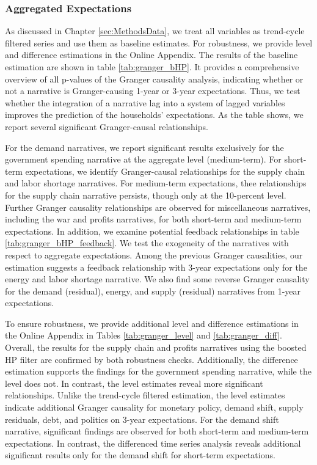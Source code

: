 \subsubsection{Aggregated Expectations}

As discussed in Chapter \ref{sec:MethodsData}, we treat all variables as trend-cycle filtered series and use them as baseline estimates. For robustness, we provide level and difference estimations in the Online Appendix. The results of the baseline estimation are shown in table \ref{tab:granger_bHP}. It provides a comprehensive overview of all p-values of the Granger causality analysis, indicating whether or not a narrative is Granger-causing 1-year or 3-year expectations. Thus, we test whether the integration of a narrative lag into a system of lagged variables improves the prediction of the households' expectations. As the table shows, we report several significant Granger-causal relationships.

For the demand narratives, we report significant results exclusively for the government spending narrative at the aggregate level (medium-term). For short-term expectations, we identify Granger-causal relationships for the supply chain and labor shortage narratives. For medium-term expectations, thee relationships for the supply chain narrative persists, though only at the 10-percent level. Further Granger causality relationships are observed for miscellaneous narratives, including the war and profits narratives, for both short-term and medium-term expectations. In addition, we examine potential feedback relationships in table \ref{tab:granger_bHP_feedback}. We test the exogeneity of the narratives with respect to aggregate expectations. Among the previous Granger causalities, our estimation suggests a feedback relationship with 3-year expectations only for the energy and labor shortage narrative. We also find some reverse Granger causality for the demand (residual), energy, and supply (residual) narratives from 1-year expectations.



To ensure robustness, we provide additional level and difference estimations in the Online Appendix in Tables \ref{tab:granger_level} and \ref{tab:granger_diff}. Overall, the results for the supply chain and profits narratives using the boosted HP filter are confirmed by both robustness checks. Additionally, the difference estimation supports the findings for the government spending narrative, while the level does not. In contrast, the level estimates reveal more significant relationships. Unlike the trend-cycle filtered estimation, the level estimates indicate additional Granger causality for monetary policy, demand shift, supply residuals, debt, and politics on 3-year expectations. For the demand shift narrative, significant findings are observed for both short-term and medium-term expectations. In contrast, the differenced time series analysis reveals additional significant results only for the demand shift for short-term expectations.

